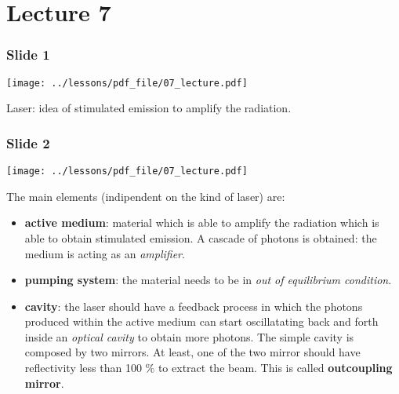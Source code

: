 \documentclass[../main/main.tex]{subfiles}
\begin{document}
\pagestyle{plain}

\section{Lecture 7}


\subsubsection*{Slide 1}

\begin{minipage}[]{0.5\linewidth}
\centering
\texttt{[image: ../lessons/pdf\_file/07\_lecture.pdf]}
\end{minipage}
\hspace{0.3cm}\vspace{0.3cm}
\begin{minipage}[c]{0.47\linewidth}

Laser: idea of stimulated emission to amplify the radiation.

\end{minipage}

\subsubsection*{Slide 2}

\begin{minipage}[]{0.5\linewidth}
\centering
\texttt{[image: ../lessons/pdf\_file/07\_lecture.pdf]}
\end{minipage}
\hspace{0.3cm}\vspace{0.3cm}
\begin{minipage}[c]{0.47\linewidth}

The main elements (indipendent on the kind of laser) are:
\begin{itemize}
\item \textbf{active medium}: material which is able to amplify the radiation which is able to obtain stimulated emission. A cascade of photons is obtained: the medium is acting as an \emph{amplifier}.

\item \textbf{pumping system}: the material needs to be in \emph{out of equilibrium condition}.

\item \textbf{cavity}: the laser should have a feedback process in which the photons produced within the active medium can start oscillatating back and forth inside an \emph{optical cavity} to obtain more photons. The simple cavity is composed by two mirrors. At least, one of the two mirror should have reflectivity less than 100 $\%$ to extract the beam. This is called \textbf{outcoupling mirror}.

\end{itemize}

\end{minipage}
\end{document}
